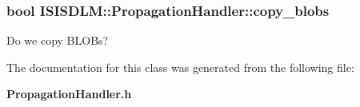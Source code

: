 \subsubsection{\setlength{\rightskip}{0pt plus 5cm}bool {\bf ISISDLM::Propagation\-Handler::copy\_\-blobs}\hspace{0.3cm}{\tt  [private]}}\label{classISISDLM_1_1PropagationHandler_r0}


Do we copy BLOBs? 



The documentation for this class was generated from the following file:\begin{CompactItemize}
\item 
{\bf Propagation\-Handler.h}\end{CompactItemize}
